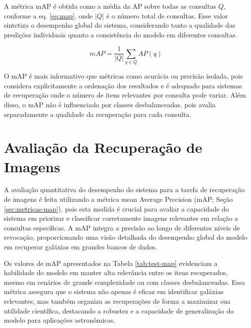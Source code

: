 A métrica mAP é obtida como a média da AP sobre todas as consultas \( Q \), conforme a eq. \eqref{eq:map}, onde \( |Q| \) é o número total de consultas. Esse valor sintetiza o desempenho global do sistema, considerando tanto a qualidade das predições individuais quanto a consistência do modelo em diferentes consultas.

\begin{equation}\label{eq:map}
  mAP = \frac{1}{|Q|} \sum_{q \in Q} AP(q)
\end{equation}

O mAP é mais informativo que métricas como acurácia ou precisão isolada, pois considera explicitamente a ordenação dos resultados e é adequado para sistemas de recuperação onde o número de itens relevantes por consulta pode variar. Além disso, o mAP não é influenciado por classes desbalanceadas, pois avalia separadamente a qualidade da recuperação para cada consulta.







\section{Avaliação da Recuperação de Imagens}
\label{sec:res-ret}

A avaliação quantitativa do desempenho do sistema para a tarefa de recuperação de imagens é feita utilizando a métrica mean Average Precision (mAP; Seção \ref{sec:metricas-map}), pois esta medida é crucial para avaliar a capacidade do sistema em priorizar e classificar corretamente imagens relevantes em relação a consultas específicas. A mAP integra a precisão ao longo de diferentes níveis de revocação, proporcionando uma visão detalhada do desempenho global do modelo em recuperar galáxias em grandes bancos de dados.

Os valores de mAP apresentados na Tabela \ref{tab:test-map} evidenciam a habilidade do modelo em manter alta relevância entre os itens recuperados, mesmo em cenários de grande complexidade ou com classes desbalanceadas. Essa métrica assegura que o sistema não apenas é eficaz em identificar galáxias relevantes, mas também organiza as recuperações de forma a maximizar sua utilidade científica, destacando a robustez e a capacidade de generalização do modelo para aplicações astronômicas.

